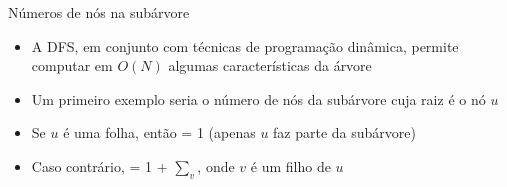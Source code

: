 \begin{frame}[fragile]{Números de nós na subárvore}

    \begin{itemize}
        \item A DFS, em conjunto com técnicas de programação dinâmica, permite computar em
            $O(N)$ algumas características da árvore

        \item Um primeiro exemplo seria o número de nós   da subárvore cuja raiz 
        é o nó $u$

        \item Se $u$ é uma folha, então  = 1 (apenas $u$ faz parte da subárvore)

        \item Caso contrário,  = 1 + $\sum_v$, onde 
        $v$ é um filho de $u$

    \end{itemize}

\end{frame}

